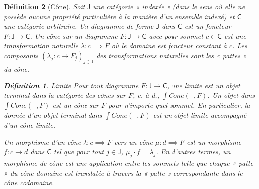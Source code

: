 \documentclass[justified]{tufte-handout}
\newtheorem{definition}{Définition}
\def\msf{\mathsf}
\begin{document}
\begin{definition}[Cône]
	Soit $\msf{J}$ une catégorie « indexée » (dans le sens où elle ne possède aucune propriété particulière à la manière d'un ensemble indexé) et $\msf{C}$ une catégorie arbitraire.
	Un diagramme de forme $\msf{J}$ dans $\msf{C}$ est un foncteur $F : \msf{J} \rightarrow \msf{C}$.
	Un cône sur un diagramme $F : \msf{J} \to \msf{C}$ avec pour sommet $c \in \msf{C}$ est une transformation naturelle $\lambda : c \implies F$ où le domaine est foncteur constant à $c$.
	Les composants $(\lambda_j : c \to F_j)_{j \in \msf{J}}$ des transformations naturelles sont les « pattes » du cône.

	\begin{definition}{Limite}
		Pour tout diagramme $F : \msf{J} \to \msf{C}$, une limite est un objet terminal dans la catégorie des cônes sur $F$, c.-à-d., $\int Cone(–, F)$.
		Un objet dans $\int Cone(–, F)$ est un cône sur $F$ pour n'importe quel sommet.
		En particulier, la donnée d'un objet terminal dans $\int Cone(–, F)$ est un objet limite accompagné d'un cône limite.

		Un morphisme d'un cône $\lambda : c \implies F$ vers un cône $\mu : d \implies
			F$ est un morphisme $f : c \to d$ dans $\msf{C}$ tel que pour tout $j \in
			\msf{J}$, $\mu_j \cdot f = \lambda_j$. En d'autres termes, un morphisme de cône
		est une application entre les sommets telle que chaque « patte » du cône
		domaine est translatée à travers la « patte » correspondante dans le cône
		codomaine.
	\end{definition}
	\begin{center}
	\end{center}


	\vspace{5pt}

\end{definition}
\end{document}
